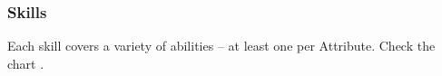 \subsubsection*{Skills}

Each skill covers a variety of abilities -- at least one per Attribute.
Check the chart .
